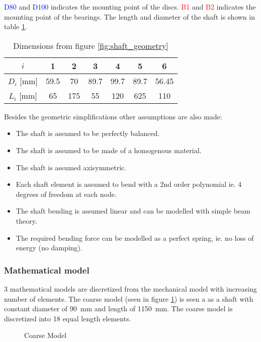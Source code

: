 \textcolor{blue}{D80} and \textcolor{blue}{D100} indicates the mounting point of the discs. \textcolor{red}{B1} and \textcolor{red}{B2} indicates the mounting point of the bearings.
The length and diameter of the shaft is shown in table \ref{tab:shaft_geometry}.
\begin{table}[ht]
    \centering
    \caption{Dimensions from figure \ref{fig:shaft_geometry}}
    \label{tab:shaft_geometry}
    \begin{tabular}{@{}ccccccc@{}}
        \toprule
        $i$  &   1   &   2   &   3   &   4   &   5   &   6   \\ \midrule
        $D_i$ [\si{\milli \meter}]  &   59.5  &   70  &   89.7  &   99.7  &   89.7  &   56.45  \\
        $L_i$ [\si{\milli \meter}]  &   65 &   175    &   55 &   120  &   625  &   110    \\ \bottomrule
    \end{tabular}
\end{table}

Besides the geometric simplifications other assumptions are also made:
\begin{itemize}
    \item The shaft is assumed to be perfectly balanced.
    \item The shaft is assumed to be made of a homogenous material.
    \item The shaft is assumed axisymmetric.
    \item Each shaft element is assumed to bend with a 2nd order polynomial ie. 4 degrees of freedom at each node.
    \item The shaft bending is assumed linear and can be modelled with simple beam theory.
    \item The required bending force can be modelled as a perfect spring, ie. no loss of energy (no damping).
\end{itemize}

\subsubsection{Mathematical model}
3 mathematical models are discretized from the mechanical model with increasing number of elements. The coarse model (seen in figure \ref{fig:coarse_model}) is seen a as a shaft with constant diameter of \SI{90}{\milli \meter} and length of \SI{1150}{\milli \meter}. The coarse model is discretized into 18 equal length elements.
\begin{figure}[ht]
    \centering
    
    \caption{Coarse Model}
    \label{fig:coarse_model}
\end{figure}

